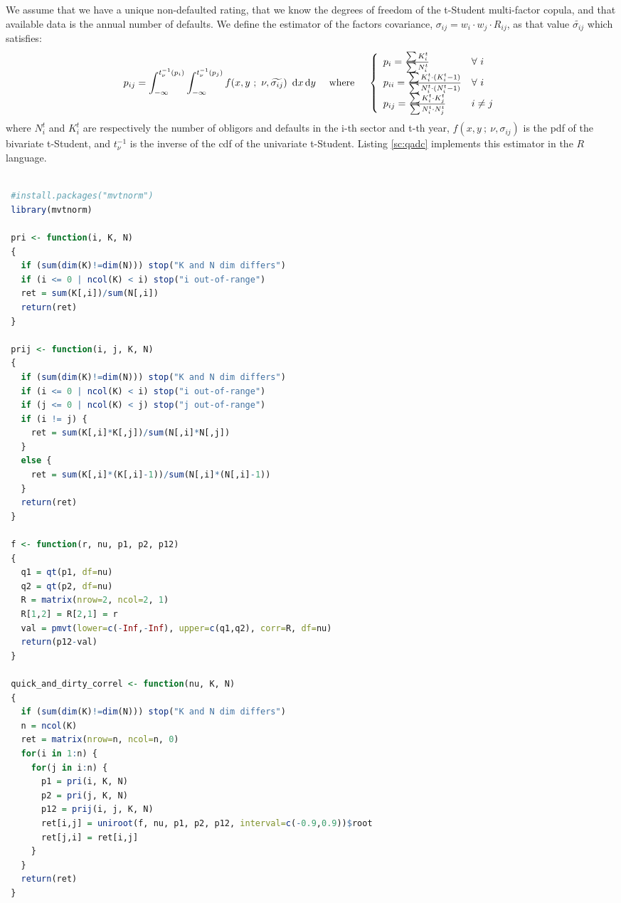 \documentclass[11pt,fleqn]{book} %
\begin{document}
\begin{definition}
	We assume that we have a unique non-defaulted rating, that we know the 
	degrees of freedom of the t-Student multi-factor copula, and that available 
	data is the annual number of defaults. We define the estimator of the 
	factors covariance, $\sigma_{ij} = w_i \cdot w_j \cdot R_{ij}$, as that 
	value $\widetilde{\sigma_{ij}}$ which satisfies:
	\begin{displaymath}
		p_{ij} = \displaystyle \int_{-\infty}^{t_{\nu}^{-1}(p_i)} \int_{-\infty}^{t_{\nu}^{-1}(p_j)} 
		f(x,y\ ;\ \nu, \widetilde{\sigma_{ij}})\ \mathop{\mathrm{{}d}}\mathopen{} x \mathop{\mathrm{{}d}}\mathopen{} y
		\quad \text{ where } \quad
		\left\{
			\begin{array}{ll}
				p_i = \frac{\sum K_i^t}{\sum N_i^t} & \forall\ i \\
				p_{ii} = \frac{\sum K_i^t \cdot (K_i^t-1)}{\sum N_i^t \cdot (N_i^t-1)} & \forall\ i \\
				p_{ij} = \frac{\sum K_i^t \cdot K_j^t}{\sum N_i^t \cdot N_j^t} & i \ne j \\
			\end{array}
		\right.
	\end{displaymath}
	where $N_i^t$ and $K_i^t$ are respectively the number of obligors and 
	defaults in the i-th sector and t-th year, $f(x,y\ ;\ \nu,\sigma_{ij})$ 
	is the pdf of the bivariate t-Student, and $t_{\nu}^{-1}$ is the inverse 
	of the cdf of the univariate t-Student. Listing \ref{sc:qadc} implements 
	this estimator in the $R$ language.
\end{definition}

\begin{lstlisting}[language=R, label=sc:qadc, caption=Quick-and-dirty correlation (R script)]

 #install.packages("mvtnorm")
 library(mvtnorm)

 pri <- function(i, K, N)
 {
   if (sum(dim(K)!=dim(N))) stop("K and N dim differs")
   if (i <= 0 | ncol(K) < i) stop("i out-of-range")
   ret = sum(K[,i])/sum(N[,i])
   return(ret)
 }

 prij <- function(i, j, K, N)
 {
   if (sum(dim(K)!=dim(N))) stop("K and N dim differs")
   if (i <= 0 | ncol(K) < i) stop("i out-of-range")
   if (j <= 0 | ncol(K) < j) stop("j out-of-range")
   if (i != j) {
     ret = sum(K[,i]*K[,j])/sum(N[,i]*N[,j])
   }
   else {
     ret = sum(K[,i]*(K[,i]-1))/sum(N[,i]*(N[,i]-1))
   }
   return(ret)
 }

 f <- function(r, nu, p1, p2, p12)
 {
   q1 = qt(p1, df=nu)
   q2 = qt(p2, df=nu)
   R = matrix(nrow=2, ncol=2, 1)
   R[1,2] = R[2,1] = r
   val = pmvt(lower=c(-Inf,-Inf), upper=c(q1,q2), corr=R, df=nu)
   return(p12-val)
 }

 quick_and_dirty_correl <- function(nu, K, N)
 {
   if (sum(dim(K)!=dim(N))) stop("K and N dim differs")
   n = ncol(K)
   ret = matrix(nrow=n, ncol=n, 0)
   for(i in 1:n) {
     for(j in i:n) {
       p1 = pri(i, K, N)
       p2 = pri(j, K, N)
       p12 = prij(i, j, K, N)
       ret[i,j] = uniroot(f, nu, p1, p2, p12, interval=c(-0.9,0.9))$root
       ret[j,i] = ret[i,j]
     }
   }
   return(ret)
 }

\end{lstlisting}
\end{document}
